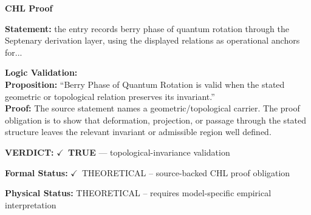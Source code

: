 \vspace{0.45em}
\noindent\textbf{CHL Proof}\par
\textbf{Statement:} the entry records berry phase of quantum rotation through the Septenary derivation
layer, using the displayed relations as operational anchors for...

\textbf{Logic Validation:}\\
\textbf{Proposition:} ``Berry Phase of Quantum Rotation is valid when the stated geometric or topological
relation preserves its invariant.''\\
\textbf{Proof:} The source statement names a geometric/topological carrier. The proof obligation is to
show that deformation, projection, or passage through the stated structure leaves the
relevant invariant or admissible region well defined.

\textbf{VERDICT:} \ensuremath{\checkmark}\ \textbf{TRUE} --- topological-invariance validation

\textbf{Formal Status:} \ensuremath{\checkmark}\ THEORETICAL -- source-backed CHL proof obligation

\textbf{Physical Status:} THEORETICAL -- requires model-specific empirical interpretation
\par\vspace{0.45em}
\par
\ifTZPDarkEdition
{}
\fi
\endgroup
\endgroup
